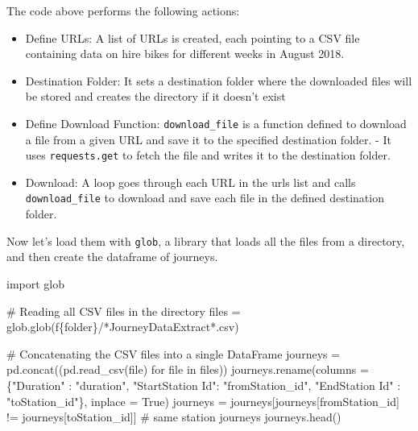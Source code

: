 \documentclass[
  letterpaper,
  DIV=11,
  numbers=noendperiod]{scrreprt}
\newenvironment{Shaded}{\begin{snugshade}}{\end{snugshade}}
\newcommand{\BuiltInTok}[1]{\textcolor[rgb]{0.00,0.23,0.31}{#1}}
\newcommand{\CommentTok}[1]{\textcolor[rgb]{0.37,0.37,0.37}{#1}}
\newcommand{\ControlFlowTok}[1]{\textcolor[rgb]{0.00,0.23,0.31}{#1}}
\newcommand{\ImportTok}[1]{\textcolor[rgb]{0.00,0.46,0.62}{#1}}
\newcommand{\KeywordTok}[1]{\textcolor[rgb]{0.00,0.23,0.31}{#1}}
\newcommand{\NormalTok}[1]{\textcolor[rgb]{0.00,0.23,0.31}{#1}}
\newcommand{\OperatorTok}[1]{\textcolor[rgb]{0.37,0.37,0.37}{#1}}
\newcommand{\SpecialCharTok}[1]{\textcolor[rgb]{0.37,0.37,0.37}{#1}}
\newcommand{\SpecialStringTok}[1]{\textcolor[rgb]{0.13,0.47,0.30}{#1}}
\newcommand{\StringTok}[1]{\textcolor[rgb]{0.13,0.47,0.30}{#1}}
\newcommand{\VariableTok}[1]{\textcolor[rgb]{0.07,0.07,0.07}{#1}}
\providecommand{\tightlist}{%
  \setlength{\itemsep}{0pt}\setlength{\parskip}{0pt}}\usepackage{longtable,booktabs,array}
\begin{document}
The code above performs the following actions:

\begin{itemize}
\tightlist
\item
  Define URLs: A list of URLs is created, each pointing to a CSV file
  containing data on hire bikes for different weeks in August 2018.
\item
  Destination Folder: It sets a destination folder where the downloaded
  files will be stored and creates the directory if it doesn't exist
\item
  Define Download Function: \texttt{download\_file} is a function
  defined to download a file from a given URL and save it to the
  specified destination folder. - It uses \texttt{requests.get} to fetch
  the file and writes it to the destination folder.
\item
  Download: A loop goes through each URL in the urls list and calls
  \texttt{download\_file} to download and save each file in the defined
  destination folder.
\end{itemize}

Now let's load them with \texttt{glob}, a library that loads all the
files from a directory, and then create the dataframe of journeys.

\begin{Shaded}
\begin{Highlighting}[]
\ImportTok{import}\NormalTok{ glob}

\CommentTok{\# Reading all CSV files in the directory}
\NormalTok{files }\OperatorTok{=}\NormalTok{ glob.glob(}\SpecialStringTok{f\textquotesingle{}}\SpecialCharTok{\{}\NormalTok{folder}\SpecialCharTok{\}}\SpecialStringTok{/*JourneyDataExtract*.csv\textquotesingle{}}\NormalTok{)}

\CommentTok{\# Concatenating the CSV files into a single DataFrame}
\NormalTok{journeys }\OperatorTok{=}\NormalTok{ pd.concat((pd.read\_csv(}\BuiltInTok{file}\NormalTok{) }\ControlFlowTok{for} \BuiltInTok{file} \KeywordTok{in}\NormalTok{ files))}
\NormalTok{journeys.rename(columns }\OperatorTok{=}\NormalTok{ \{}\StringTok{"Duration"}\NormalTok{ : }\StringTok{"duration"}\NormalTok{, }\StringTok{"StartStation Id"}\NormalTok{: }\StringTok{"fromStation\_id"}\NormalTok{, }\StringTok{"EndStation Id"}\NormalTok{ : }\StringTok{"toStation\_id"}\NormalTok{\}, inplace }\OperatorTok{=} \VariableTok{True}\NormalTok{)}
\NormalTok{journeys }\OperatorTok{=}\NormalTok{ journeys[journeys[}\StringTok{\textquotesingle{}fromStation\_id\textquotesingle{}}\NormalTok{] }\OperatorTok{!=}\NormalTok{ journeys[}\StringTok{\textquotesingle{}toStation\_id\textquotesingle{}}\NormalTok{]] }\CommentTok{\# same station journeys}
\NormalTok{journeys.head()}
\end{Highlighting}
\end{Shaded}
\end{document}
